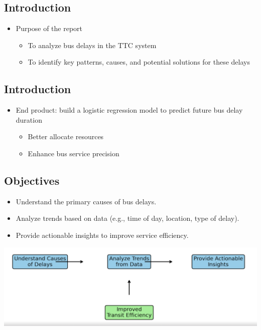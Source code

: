 \documentclass[
  letterpaper,
  DIV=11,
  numbers=noendperiod]{scrartcl}
\providecommand{\tightlist}{%
  \setlength{\itemsep}{0pt}\setlength{\parskip}{0pt}}\usepackage{longtable,booktabs,array}
\begin{document}
\subsection{Introduction}\label{introduction-3}

\begin{itemize}
\tightlist
\item
  Purpose of the report

  \begin{itemize}
  \tightlist
  \item
    To analyze bus delays in the TTC system
  \item
    To identify key patterns, causes, and potential solutions for these
    delays
  \end{itemize}
\end{itemize}

\subsection{Introduction}\label{introduction-4}

\begin{itemize}
\tightlist
\item
  End product: build a logistic regression model to predict future bus
  delay duration

  \begin{itemize}
  \tightlist
  \item
    Better allocate resources
  \item
    Enhance bus service precision
  \end{itemize}
\end{itemize}

\subsection{Objectives}\label{objectives}

\begin{itemize}
\tightlist
\item
  Understand the primary causes of bus delays.
\item
  Analyze trends based on data (e.g., time of day, location, type of
  delay).
\item
  Provide actionable insights to improve service efficiency.
\end{itemize}

\includegraphics{images/objectives.png}
\end{document}
